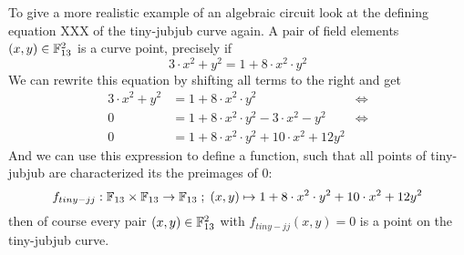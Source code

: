 \begin{example} To give a more realistic example of an algebraic circuit look at the defining equation XXX of the tiny-jubjub curve again. A pair of field elements 
$(x,y)\in \mathbb{F}_{13}^2$ is a curve point, precisely if
$$
3\cdot x^2 + y^2 = 1+ 8\cdot x^2\cdot y^2
$$  
We can rewrite this equation by shifting all terms to the right and get
\begin{align*}
3\cdot x^2 + y^2 & = 1+ 8\cdot x^2\cdot y^2 & \Leftrightarrow\\
0 & = 1+ 8\cdot x^2\cdot y^2 - 3\cdot x^2 - y^2 & \Leftrightarrow\\
0 & = 1+ 8\cdot x^2\cdot y^2 + 10\cdot x^2 +12 y^2
\end{align*}
And we can use this expression to define a function, such that all points of tiny-jubjub are characterized its the preimages of $0$:
$$
f_{tiny-jj}: \mathbb{F}_{13}\times \mathbb{F}_{13}\to \mathbb{F}_{13}\; ; \;
(x,y)\mapsto 1+ 8\cdot x^2\cdot y^2 + 10\cdot x^2 +12 y^2
$$
then of course every pair $(x,y)\in \mathbb{F}_{13}^2$ with $f_{tiny-jj}(x,y)=0$ is a point on the tiny-jubjub curve.


\end{example}
